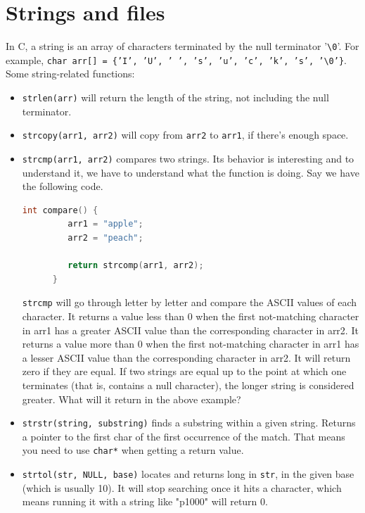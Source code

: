 \documentclass[nobib]{tufte-handout}
\begin{document}
\pagebreak 

\section{Strings and files}
In C, a string is an array of characters terminated by the null terminator '\texttt{\textbackslash 0}'.
For example, \texttt{char arr[] = \{'I', 'U', ' ', 's', 'u', 'c', 'k', 's', '\textbackslash0'\}}. 
Some string-related functions: 
\begin{itemize}
   \item \texttt{strlen(arr)} will return the length of the string, not including the null terminator. 
   \item \texttt{strcopy(arr1, arr2)} will copy from \texttt{arr2} to \texttt{arr1}, if there's enough space. 
   \item \texttt{strcmp(arr1, arr2)} compares two strings. Its behavior is interesting and to understand 
   it, we have to understand what the function is doing. Say we have the following code. 
   \begin{lstlisting}[language=C,caption=strcomp]
      int compare() {
         arr1 = "apple";
         arr2 = "peach";

         return strcomp(arr1, arr2);
      }
   \end{lstlisting}
   \texttt{strcmp} will go through letter by letter and compare the ASCII values of 
   each character. It returns a value less than 0 when the first 
   not-matching character in arr1 has a greater ASCII value than 
   the corresponding character in arr2. It returns a value more than 0 when the first not-matching 
   character in arr1 has a lesser ASCII value than the corresponding 
   character in arr2. It will return zero if they are equal.  If two strings are equal 
   up to the point at which one terminates (that is, contains a null character), 
   the longer string is considered greater. What will it return in the above example?
   \item \texttt{strstr(string, substring)} finds a substring within a given string. Returns a pointer to 
   the first char of the first occurrence of the match. That means you need to use \texttt{char*} when 
   getting a return value. 
   \item \texttt{strtol(str, NULL, base)} locates and returns long in \texttt{str}, in the given base (which is usually 10). 
   It will stop searching once it hits a character, which means running it with 
   a string like "p1000" will return 0. 
\end{itemize}
\end{document}
